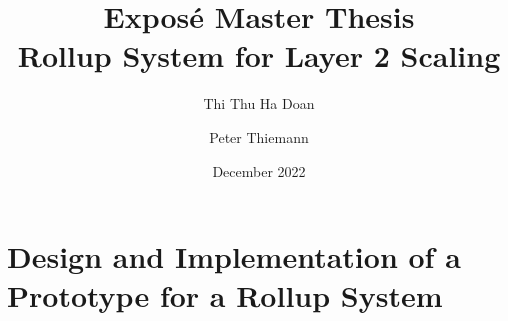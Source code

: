 \documentclass{article}
\title{Expos\'{e} Master Thesis\\
  Rollup System for Layer 2 Scaling}
\author{Thi Thu Ha Doan \and  Peter Thiemann}
\date{December 2022}
\begin{document}
\maketitle

\section{Design and Implementation of a Prototype for a Rollup System}




\end{document}

